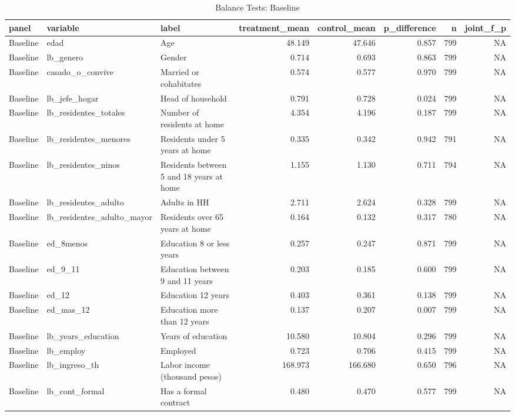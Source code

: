 \begin{table}

\caption{Balance Tests: Baseline}
\centering
\begin{tabular}[t]{lllrrrrr}
\toprule
panel & variable & label & treatment\_mean & control\_mean & p\_difference & n & joint\_f\_p\\
\midrule
Baseline & edad & Age & 48.149 & 47.646 & 0.857 & 799 & NA\\
Baseline & lb\_genero & Gender & 0.714 & 0.693 & 0.863 & 799 & NA\\
Baseline & casado\_o\_convive & Married or cohabitates & 0.574 & 0.577 & 0.970 & 799 & NA\\
Baseline & lb\_jefe\_hogar & Head of household & 0.791 & 0.728 & 0.024 & 799 & NA\\
Baseline & lb\_residentes\_totales & Number of residents at home & 4.354 & 4.196 & 0.187 & 799 & NA\\
\addlinespace
Baseline & lb\_residentes\_menores & Residents under 5 years at home & 0.335 & 0.342 & 0.942 & 791 & NA\\
Baseline & lb\_residentes\_ninos & Residents between 5 and 18 years at home & 1.155 & 1.130 & 0.711 & 794 & NA\\
Baseline & lb\_residentes\_adulto & Adults in HH & 2.711 & 2.624 & 0.328 & 799 & NA\\
Baseline & lb\_residentes\_adulto\_mayor & Residents over 65 years at home & 0.164 & 0.132 & 0.317 & 780 & NA\\
Baseline & ed\_8menos & Education 8 or less years & 0.257 & 0.247 & 0.871 & 799 & NA\\
\addlinespace
Baseline & ed\_9\_11 & Education between 9 and 11 years & 0.203 & 0.185 & 0.600 & 799 & NA\\
Baseline & ed\_12 & Education 12 years & 0.403 & 0.361 & 0.138 & 799 & NA\\
Baseline & ed\_mas\_12 & Education more than 12 years & 0.137 & 0.207 & 0.007 & 799 & NA\\
Baseline & lb\_years\_education & Years of education & 10.580 & 10.804 & 0.296 & 799 & NA\\
Baseline & lb\_employ & Employed & 0.723 & 0.706 & 0.415 & 799 & NA\\
\addlinespace
Baseline & lb\_ingreso\_th & Labor income (thousand pesos) & 168.973 & 166.680 & 0.650 & 796 & NA\\
Baseline & lb\_cont\_formal & Has a formal contract & 0.480 & 0.470 & 0.577 & 799 & NA\\

\end{tabular}
\end{table}
